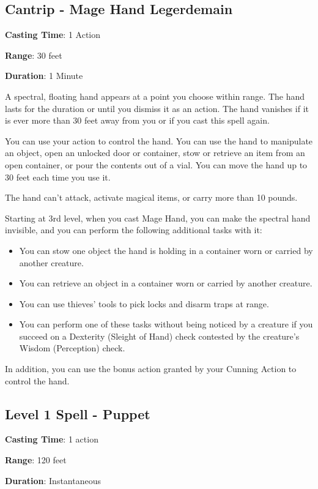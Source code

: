 \documentclass{article}
\begin{document}
\subsection{Cantrip - Mage Hand Legerdemain}
\noindent\textbf{Casting Time}: 1 Action

\noindent\textbf{Range}: 30 feet

\noindent\textbf{Duration}: 1 Minute

A spectral, floating hand appears at a point you choose within range. The hand lasts for the duration or until you dismiss it as an action. The hand vanishes if it is ever more than 30 feet away from you or if you cast this spell again.

You can use your action to control the hand. You can use the hand to manipulate an object, open an unlocked door or container, stow or retrieve an item from an open container, or pour the contents out of a vial. You can move the hand up to 30 feet each time you use it.

The hand can't attack, activate magical items, or carry more than 10 pounds.

Starting at 3rd level, when you cast Mage Hand, you can make the spectral hand invisible, and you can perform the following additional tasks with it:

\begin{itemize}
\item You can stow one object the hand is holding in a container worn or carried by another creature.
\item You can retrieve an object in a container worn or carried by another creature.
\item You can use thieves' tools to pick locks and disarm traps at range.
\item You can perform one of these tasks without being noticed by a creature if you succeed on a Dexterity (Sleight of Hand) check contested by the creature's Wisdom (Perception) check.
\end{itemize}

In addition, you can use the bonus action granted by your Cunning Action to control the hand.

\subsection{Level 1 Spell - Puppet}
\noindent\textbf{Casting Time}: 1 action

\noindent\textbf{Range}: 120 feet

\noindent\textbf{Duration}: Instantaneous
\end{document}
